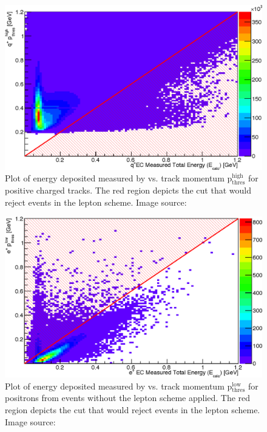 \begin{figure}\begin{center}
\includegraphics[width=0.9\columnwidth]{figures/lepton/Pip_EChigh.eps}
\caption[ Deposited Energy Comparison to Upper Threshold Track Momentum for q$^+$ Tracks]{\label{fig:islep.pipEChigh}Plot of energy deposited measured by  vs. track momentum p$\mathrm{_{thres}^{high}}$ for positive charged tracks. The red region depicts the cut that would reject events in the  lepton   scheme. Image source:~\cite{clas.thesis.kunkel}}
\end{center}\end{figure}

\begin{figure}\begin{center}
\includegraphics[width=0.9\columnwidth]{figures/lepton/Pip_EClowcut.eps}
\caption[ Deposited Energy Comparison to Track Momentum for e$^+$ Candidates]{\label{fig:islep.pipEC}Plot of energy deposited measured by  vs. track momentum p$\mathrm{_{thres}^{low}}$ for positrons from \π[0] events without the  lepton   scheme applied. The red region depicts the cut that would reject events in the  lepton   scheme. Image source:~\cite{clas.thesis.kunkel}}
\end{center}\end{figure}

